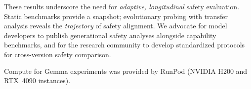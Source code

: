 \documentclass{article}
\begin{document}
These results underscore the need for \emph{adaptive, longitudinal}
safety evaluation. Static benchmarks provide a snapshot; evolutionary
probing with transfer analysis reveals the \emph{trajectory} of safety
alignment. We advocate for model developers to publish generational
safety analyses alongside capability benchmarks, and for the research
community to develop standardized protocols for cross-version
safety comparison.


\begin{ack}
Compute for Gemma experiments was provided by RunPod (NVIDIA H200
and RTX~4090 instances).
\end{ack}




\newpage

\end{document}
